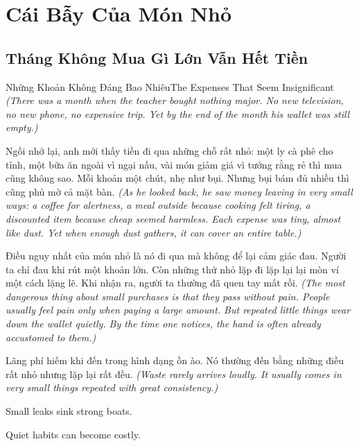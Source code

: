 \chapter{Cái Bẫy Của Món Nhỏ}

\section{Tháng Không Mua Gì Lớn Vẫn Hết Tiền}
\begin{truyen}{Những Khoản Không Đáng Bao Nhiêu}{The Expenses That Seem Insignificant}
\textit{(There was a month when the teacher bought nothing major. No new television, no new phone, no expensive trip. Yet by the end of the month his wallet was still empty.)}

Ngồi nhớ lại, anh mới thấy tiền đi qua những chỗ rất nhỏ: một ly cà phê cho tỉnh, một bữa ăn ngoài vì ngại nấu, vài món giảm giá vì tưởng rằng rẻ thì mua cũng không sao. Mỗi khoản một chút, nhẹ như bụi. Nhưng bụi bám đủ nhiều thì cũng phủ mờ cả mặt bàn.
\textit{(As he looked back, he saw money leaving in very small ways: a coffee for alertness, a meal outside because cooking felt tiring, a discounted item because cheap seemed harmless. Each expense was tiny, almost like dust. Yet when enough dust gathers, it can cover an entire table.)}

Điều nguy nhất của món nhỏ là nó đi qua mà không để lại cảm giác đau. Người ta chỉ đau khi rút một khoản lớn. Còn những thứ nhỏ lặp đi lặp lại lại mòn ví một cách lặng lẽ. Khi nhận ra, người ta thường đã quen tay mất rồi.
\textit{(The most dangerous thing about small purchases is that they pass without pain. People usually feel pain only when paying a large amount. But repeated little things wear down the wallet quietly. By the time one notices, the hand is often already accustomed to them.)}
\end{truyen}

\begin{baihoc}
Lãng phí hiếm khi đến trong hình dạng ồn ào. Nó thường đến bằng những điều rất nhỏ nhưng lặp lại rất đều.
\textit{(Waste rarely arrives loudly. It usually comes in very small things repeated with great consistency.)}
\end{baihoc}

\begin{ghinhoanh}
Small leaks sink strong boats.

Quiet habits can become costly.
\end{ghinhoanh}

